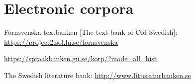 \documentclass[output=paper]{langscibook}
\begin{document}
\section*{Electronic corpora}
\begin{description}[font=\normalfont]
\item[FTB:] Fornsvenska textbanken [The text bank of Old Swedish]:  \url{https://project2.sol.lu.se/fornsvenska} 
\item[Korp:] \url{https://spraakbanken.gu.se/korp/?mode=all_hist}
\item[LB:] The Swedish literature bank: \url{http://www.litteraturbanken.se}
\end{description}

{\sloppy\printbibliography[heading=subbibliography,notkeyword=this]}
\end{document}
